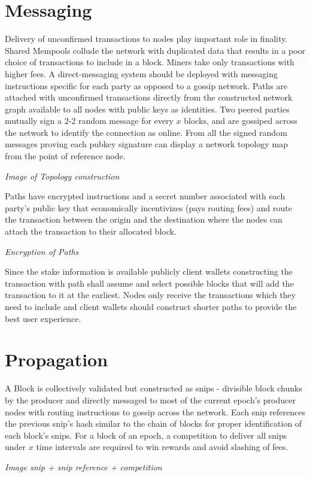 \documentclass[a4paper,10pt]{article}
\begin{document}
\section{Messaging}
Delivery of unconfirmed transactions to nodes play important role in finality. Shared Mempools collude the network with duplicated data that results in a poor choice of transactions to include in a block. Miners take only transactions with higher fees. A direct-messaging system should be deployed with messaging instructions specific for each party as opposed to a gossip network. Paths are attached with unconfirmed transactions directly from the constructed network graph available to all nodes with public keys as identities. Two peered parties mutually sign a 2-2 random message for every $x$ blocks, and are gossiped across the network to identify the connection as online. From all the signed random messages proving each pubkey signature can display a network topology map from the point of reference node. 

\textit{Image of Topology construction}

Paths have encrypted instructions and a secret number associated with each party's public key that economically incentivizes (pays routing fees) and route the transaction between the origin and the destination where the nodes can attach the transaction to their allocated block. 

\textit{Encryption of Paths}

Since the stake information is available publicly client wallets constructing the transaction with path shall assume and select possible blocks that will add the transaction to it at the earliest. Nodes only receive the transactions which they need to include and client wallets should construct shorter paths to provide the best user experience.
\section{Propagation}
A Block is collectively validated but constructed as snips - divisible block chunks by the producer and directly messaged to most of the current epoch's producer nodes with routing instructions to gossip across the network. Each snip references the previous snip's hash similar to the chain of blocks for proper identification of each block's snips. For a block of an epoch, a competition to deliver all snips under $x$ time intervals are required to win rewards and avoid slashing of fees. 

\textit{Image snip + snip reference + competition}
\end{document}
